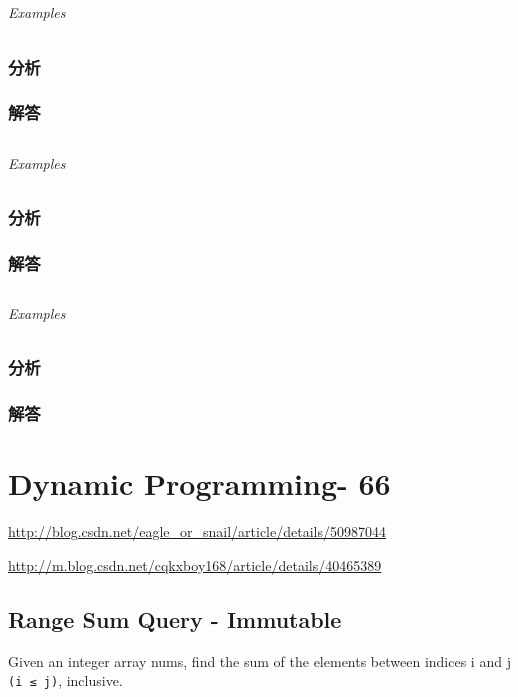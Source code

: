 \documentclass[UTF8,a4paper,12pt]{ctexbook}
\begin{document}
\section{}
	
	\subparagraph{Examples}
	
	\subsection{分析}
	
	\subsection{解答}
	
\section{}
	
	\subparagraph{Examples}
	
	\subsection{分析}
	
	\subsection{解答}
	
\section{}
	
	\subparagraph{Examples}
	
	\subsection{分析}
	
	\subsection{解答}
\chapter{Dynamic Programming- 66}
	\url{http://blog.csdn.net/eagle_or_snail/article/details/50987044}
	
	\url{http://m.blog.csdn.net/cqkxboy168/article/details/40465389}
	
\section{Range Sum Query - Immutable}
		Given an integer array nums, find the sum of the elements between indices i and j \verb|(i ≤ j)|, inclusive.
		
\end{document}
